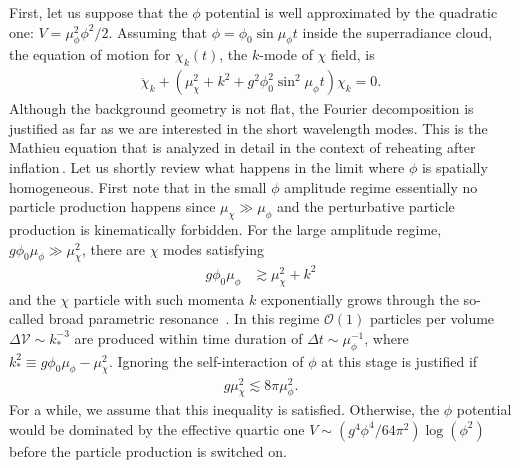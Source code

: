 \documentclass[%
 preprint,
 nofootinbib,
 amsmath,amssymb,
 aps,
 a4paper
]{revtex4-1}
\begin{document}
First, let us suppose that the $\phi$ potential is well approximated by the quadratic one: $V=\mu_\phi^2\phi^2/2$.
Assuming that $\phi = \phi_0 \sin \mu_\phi t$ inside the superradiance cloud, the equation of motion for $\chi_k(t)$, the $k$-mode of $\chi$ field, is
\begin{align}
\label{eq:Chi_EOM}
    \ddot\chi_k + (\mu_\chi^2 + k^2 + g^2 \phi_0^2 \sin^2 \mu_\phi t)\chi_k = 0.
\end{align}
Although the background geometry is not flat, the Fourier decomposition is justified as far as we are interested in the short wavelength modes.
This is the Mathieu equation that is analyzed in detail in the context of reheating after inflation\,\cite{Dolgov:1989us,Traschen:1990sw,Shtanov:1994ce,Kofman:1994rk,Kofman:1997yn}. Let us shortly review what happens in the limit where $\phi$ is spatially homogeneous. 
First note that in the small $\phi$ amplitude regime essentially no particle production happens since $\mu_\chi\gg \mu_\phi$ and the perturbative particle production is kinematically forbidden.
For the large amplitude regime, $g \phi_0 \mu_\phi \gg \mu_\chi^2$, there are $\chi$ modes satisfying
\begin{align}
	g \phi_0 \mu_\phi &\gtrsim \mu_\chi^2 + k^2
\end{align}
and the $\chi$ particle with such momenta $k$ exponentially grows through the so-called broad parametric resonance~\cite{Kofman:1994rk, Kofman:1997yn}.
In this regime $\mathcal{O}(1)$ particles per volume $\Delta \mathcal V \sim k_*^{-3}$ are produced within time duration of $\Delta t \sim \mu_\phi^{-1}$, where $k_*^2\equiv g\phi_0 \mu_\phi- \mu_\chi^2$. 
Ignoring the self-interaction of $\phi$ at this stage is justified if
\begin{align}
	g \mu_\chi^2 \lesssim 8\pi \mu_\phi^2.   \label{phi_nonlinear}
\end{align}
For a while, we assume that this inequality is satisfied. Otherwise, the $\phi$ potential would be dominated by the effective quartic one $V\sim (g^4\phi^4/64\pi^2) \log(\phi^2)$ before the particle production is switched on. 
\end{document}
